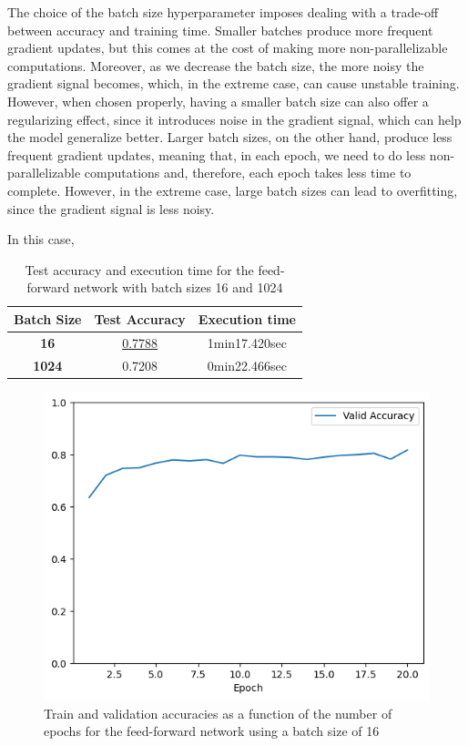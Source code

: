 \documentclass[12pt]{article}
\begin{document}
\begin{itemize}
          The choice of the batch size hyperparameter imposes dealing with a trade-off between accuracy and training time. Smaller batches produce more frequent gradient updates, but this comes at the cost of making more non-parallelizable computations. Moreover, as we decrease the batch size, the more noisy the gradient signal becomes, which, in the extreme case, can cause unstable training. However, when chosen properly, having a smaller batch size can also offer a regularizing effect, since it introduces noise in the gradient signal, which can help the model generalize better. Larger batch sizes, on the other hand, produce less frequent gradient updates, meaning that, in each epoch, we need to do less non-parallelizable computations and, therefore, each epoch takes less time to complete. However, in the extreme case, large batch sizes can lead to overfitting, since the gradient signal is less noisy. 

          In this case,

          \begin{table}[H]
              \centering
              \begin{tabular}{|c|cc|}
                  \toprule
                  \textbf{Batch Size} & \textbf{Test Accuracy} & \textbf{Execution time} \\
                  \midrule
                  \textbf{16}         & \underline{0.7788}     & 1min17.420sec           \\
                  \textbf{1024}       & 0.7208                 & 0min22.466sec           \\
                  \bottomrule
              \end{tabular}
              \caption{Test accuracy and execution time for the feed-forward network with batch sizes 16 and 1024}
              \label{tab:2.2a}
          \end{table}

          \begin{figure}[H]
              \centering
              \includegraphics[width=0.5\linewidth]{../outputs/hw1-q2-2a-acc-16.png}
              \caption{Train and validation accuracies as a function of the number of epochs for the feed-forward network using a batch size of 16}
              \label{fig:2.2a:acc:16}
          \end{figure}


\end{itemize}
\end{document}

